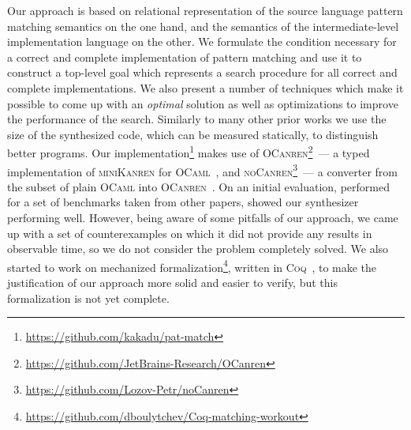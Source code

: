 Our approach is based on relational representation of the source language pattern matching semantics on the one hand, and
the semantics of the intermediate-level implementation language on the other. We formulate the condition necessary for a correct and complete implementation of pattern matching and use it to
construct a top-level goal which represents a search procedure for all correct and complete implementations. We also present a number of techniques which make it possible to come up with an
\emph{optimal} solution as well as optimizations to improve the performance of the search. Similarly to many other prior works we use the size of the synthesized code, which can be measured
statically, to distinguish better programs. Our implementation\footnote{\url{https://github.com/kakadu/pat-match}} makes use of \textsc{OCanren}\footnote{\url{https://github.com/JetBrains-Research/OCanren}}~--- a typed implementation of \textsc{miniKanren} for \textsc{OCaml}~\cite{OCanren}, and \textsc{noCanren}\footnote{\url{https://github.com/Lozov-Petr/noCanren}}~--- a converter from the subset
of plain \textsc{OCaml} into \textsc{OCanren}~\cite{conversion}. On an initial  evaluation, performed for a set of benchmarks taken from other papers, showed our synthesizer performing well.
However, being aware of some pitfalls of our approach, we came up with a set of counterexamples on which it did not provide any results in observable time, so we do not consider the problem
completely solved. We also started to work on mechanized formalization\footnote{\url{https://github.com/dboulytchev/Coq-matching-workout}}, written in \textsc{Coq}~\cite{Coq}, to
make the justification of our approach more solid and easier to verify, but this formalization is not yet complete. 

 

\begin{comment}
We apply relational programming techniques to the problem of synthesizing efficient implementation for a pattern matching construct.
Although in principle pattern matching can be implemented in a trivial way, the result suffers from inefficiency in terms of both
performance and code size. Thus, in implementing functional languages alternative, more elaborate  approaches are widely used.
However, as there are multiple kinds and flavors of pattern matching constructs, these approaches have to be specifically developed
and justified for each concrete inhabitant of the pattern matching ``zoo''. We formulate the pattern matching synthesis problem in
declarative terms and apply relational programming, a specific form of constraint logic programming, to develop a 
develop optimizations which improve the efficiency of the synthesis and guarantee the
optimality of the result. 
\end{comment}
